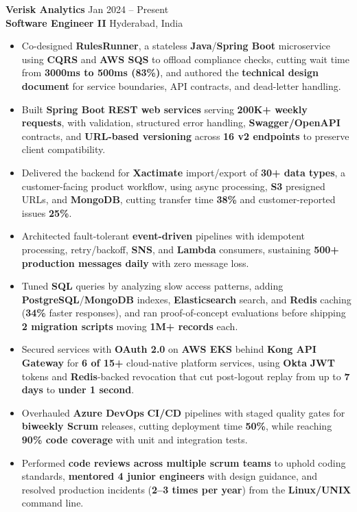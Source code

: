 \documentclass[a4paper,10pt]{article}
\begin{document}
\textbf{Verisk Analytics} \hfill Jan 2024 -- Present \\
\textbf{Software Engineer II} \hfill Hyderabad, India

\begin{itemize}[leftmargin=*]
    \item Co-designed \textbf{RulesRunner}, a stateless \textbf{Java}/\textbf{Spring Boot} microservice using \textbf{CQRS} and \textbf{AWS SQS} to offload compliance checks, cutting wait time from \textbf{3000ms to 500ms (83\%)}, and authored the \textbf{technical design document} for service boundaries, API contracts, and dead-letter handling.
    \item Built \textbf{Spring Boot} \textbf{REST web services} serving \textbf{200K+ weekly requests}, with validation, structured error handling, \textbf{Swagger/OpenAPI} contracts, and \textbf{URL-based versioning} across \textbf{16 v2 endpoints} to preserve client compatibility.
    \item Delivered the backend for \textbf{Xactimate} import/export of \textbf{30+ data types}, a customer-facing product workflow, using async processing, \textbf{S3} presigned URLs, and \textbf{MongoDB}, cutting transfer time \textbf{38\%} and customer-reported issues \textbf{25\%}.
    \item Architected fault-tolerant \textbf{event-driven} pipelines with idempotent processing, retry/backoff, \textbf{SNS}, and \textbf{Lambda} consumers, sustaining \textbf{500+ production messages daily} with zero message loss.
    \item Tuned \textbf{SQL} queries by analyzing slow access patterns, adding \textbf{PostgreSQL}/\textbf{MongoDB} indexes, \textbf{Elasticsearch} search, and \textbf{Redis} caching (\textbf{34\%} faster responses), and ran proof-of-concept evaluations before shipping \textbf{2 migration scripts} moving \textbf{1M+ records} each.
    \item Secured services with \textbf{OAuth 2.0} on \textbf{AWS EKS} behind \textbf{Kong API Gateway} for \textbf{6 of 15+} cloud-native platform services, using \textbf{Okta} \textbf{JWT} tokens and \textbf{Redis}-backed revocation that cut post-logout replay from up to \textbf{7 days} to \textbf{under 1 second}.
    \item Overhauled \textbf{Azure DevOps} \textbf{CI/CD} pipelines with staged quality gates for \textbf{biweekly Scrum} releases, cutting deployment time \textbf{50\%}, while reaching \textbf{90\% code coverage} with unit and integration tests.
    \item Performed \textbf{code reviews across multiple scrum teams} to uphold coding standards, \textbf{mentored 4 junior engineers} with design guidance, and resolved production incidents (\textbf{2--3 times per year}) from the \textbf{Linux/UNIX} command line.
\end{itemize}
\end{document}
